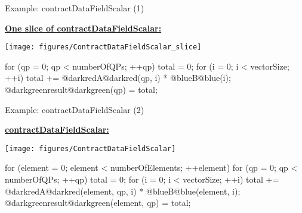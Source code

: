 \begin{frame}[fragile]{Example: contractDataFieldScalar (1)}

  \ul{\textbf{One slice of contractDataFieldScalar:}}

  \vspace{-10pt}

  \begin{center}
    \texttt{[image: figures/ContractDataFieldScalar\_slice]}
  \end{center}

  \begin{code}[frame=single, keywords={}]
for (qp = 0; qp < numberOfQPs; ++qp) {
  total = 0;
  for (i = 0; i < vectorSize; ++i) {
    total += @darkredA@darkred(qp, i) * @blueB@blue(i);
  }
  @darkgreenresult@darkgreen(qp) = total;
}
  \end{code}

\end{frame}


\begin{frame}[fragile]{Example: contractDataFieldScalar (2)}

  \ul{\textbf{contractDataFieldScalar:}}

  \vspace{-10pt}

  \begin{center}
    \texttt{[image: figures/ContractDataFieldScalar]}
  \end{center}

  \vspace{-10pt}

  \begin{code}[frame=single, keywords={}]
for (element = 0; element < numberOfElements; ++element) {
  for (qp = 0; qp < numberOfQPs; ++qp) {
    total = 0;
    for (i = 0; i < vectorSize; ++i) {
      total += @darkredA@darkred(element, qp, i) * @blueB@blue(element, i);
    }
    @darkgreenresult@darkgreen(element, qp) = total;
  }
}
  \end{code}

\end{frame}


